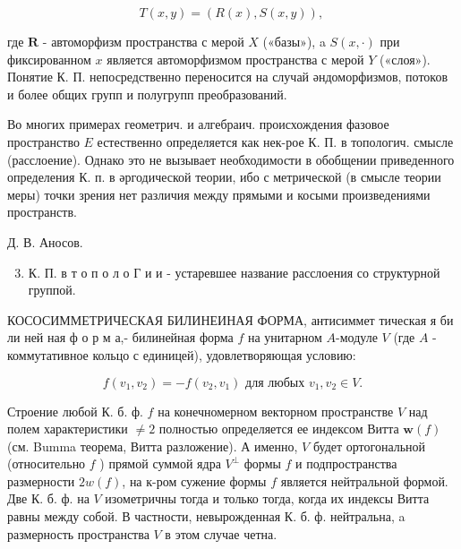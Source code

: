 \documentclass[10pt]{article}
\begin{document}
\[

T(x, y)=(R(x), S(x, y)) \text {, }

\]



где $\boldsymbol{R}$ - автоморфизм пространства с мерой $X$ («базы»), a $S(x, \cdot)$ при фиксированном $x$ является автоморфизмом пространства с мерой $Y$ («слоя»). Понятие К. П. непосредственно переносится на случай әндоморфизмов, потоков и более общих групп и полугрупп преобразований.



Во многих примерах геометрич. и алгебраич. происхождения фазовое пространство $E$ естественно определяется как нек-рое К. П. в топологич. смысле (расслоение). Однако это не вызывает необходимости в обобщении приведенного определения К. п. в әргодической теории, ибо с метрической (в смысле теории меры) точки зрения нет различия между прямыми и косыми произведениями пространств.



Д. В. Аносов.



\begin{enumerate}

  \setcounter{enumi}{2}

  \item К. П. в т о п о л о Г и и - устаревшее название расслоения со структурной группой.

\end{enumerate}



КОСОСИММЕТРИЧЕСКАЯ БИЛИНЕИНАЯ ФОРМА, антисиммет тическая я би ли ней ная ф о р м а,- билинейная форма $f$ на унитарном $A$-модуле $V$ (где $A$ - коммутативное кольцо с единицей), удовлетворяющая условию:



\[

f\left(v_{1}, v_{2}\right)=-f\left(v_{2}, v_{1}\right) \text { для любых } v_{1}, v_{2} \in V .

\]



Строение любой К. б. ф. $f$ на конечномерном векторном пространстве $V$ над полем характеристики $\neq 2$ полностью определяется ее индексом Витта $\boldsymbol{w}(f)$ (см. Bumma теорема, Витта разложение). А именно, $V$ будет ортогональной (относительно $f$ ) прямой суммой ядра $V^{\perp}$ формы $f$ и подпространства размерности $2 w(f)$, на к-ром сужение формы $f$ является нейтральной формой. Две К. б. ф. на $V$ изометричны тогда и только тогда, когда их индексы Витта равны между собой. В частности, невырожденная К. б. ф. нейтральна, a размерность пространства $V$ в этом случае четна.
\end{document}
